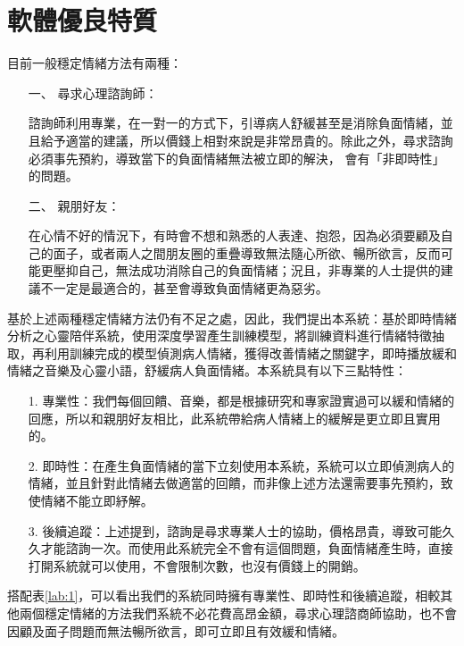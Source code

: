 \documentclass[12pt]{scrreprt}
\begin{document}
\section{軟體優良特質}
目前一般穩定情緒方法有兩種：

\begin{itemize}
\item[一、]{尋求心理諮詢師：}

諮詢師利用專業，在一對一的方式下，引導病人舒緩甚至是消除負面情緒，並且給予適當的建議，所以價錢上相對來說是非常昂貴的。除此之外，尋求諮詢必須事先預約，導致當下的負面情緒無法被立即的解決， 會有「非即時性」的問題。

\item[二、]{親朋好友：}

在心情不好的情況下，有時會不想和熟悉的人表達、抱怨，因為必須要顧及自己的面子，或者兩人之間朋友圈的重疊導致無法隨心所欲、暢所欲言，反而可能更壓抑自己，無法成功消除自己的負面情緒；況且，非專業的人士提供的建議不一定是最適合的，甚至會導致負面情緒更為惡劣。

\end{itemize}

基於上述兩種穩定情緒方法仍有不足之處，因此，我們提出本系統：基於即時情緒分析之心靈陪伴系統，使用深度學習產生訓練模型，將訓練資料進行情緒特徵抽取，再利用訓練完成的模型偵測病人情緒，獲得改善情緒之關鍵字，即時播放緩和情緒之音樂及心靈小語，舒緩病人負面情緒。本系統具有以下三點特性：
\begin{itemize}
\item[1.]{專業性：}我們每個回饋、音樂，都是根據研究和專家證實過可以緩和情緒的回應，所以和親朋好友相比，此系統帶給病人情緒上的緩解是更立即且實用的。


\item[2.]{ 即時性：}在產生負面情緒的當下立刻使用本系統，系統可以立即偵測病人的情緒，並且針對此情緒去做適當的回饋，而非像上述方法還需要事先預約，致使情緒不能立即紓解。


\item[3.] {後續追蹤：}上述提到，諮詢是尋求專業人士的協助，價格昂貴，導致可能久久才能諮詢一次。而使用此系統完全不會有這個問題，負面情緒產生時，直接打開系統就可以使用，不會限制次數，也沒有價錢上的開銷。
\end{itemize}

搭配表\ref{lab:1}，可以看出我們的系統同時擁有專業性、即時性和後續追蹤，相較其他兩個穩定情緒的方法我們系統不必花費高昂金額，尋求心理諮商師協助，也不會因顧及面子問題而無法暢所欲言，即可立即且有效緩和情緒。\\
\end{document}
